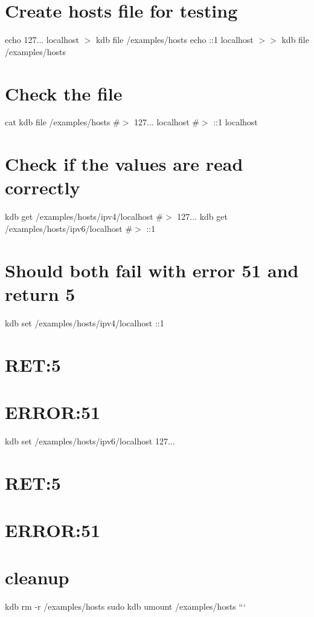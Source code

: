 \section*{Create hosts file for testing}

echo \textquotesingle{}127... localhost\textquotesingle{} $>$ {\ttfamily kdb file /examples/hosts} echo \textquotesingle{}\+:\+:1 localhost\textquotesingle{} $>$$>$ {\ttfamily kdb file /examples/hosts}

\section*{Check the file}

cat {\ttfamily kdb file /examples/hosts} \#$>$ 127... localhost \#$>$ \+:\+:1 localhost

\section*{Check if the values are read correctly}

kdb get /examples/hosts/ipv4/localhost \#$>$ 127... kdb get /examples/hosts/ipv6/localhost \#$>$ \+:\+:1

\section*{Should both fail with error 51 and return 5}

kdb set /examples/hosts/ipv4/localhost \+:\+:1 \section*{R\+ET\+:5}

\section*{E\+R\+R\+OR\+:51}

kdb set /examples/hosts/ipv6/localhost 127... \section*{R\+ET\+:5}

\section*{E\+R\+R\+OR\+:51}

\section*{cleanup}

kdb rm -\/r /examples/hosts sudo kdb umount /examples/hosts ``` 